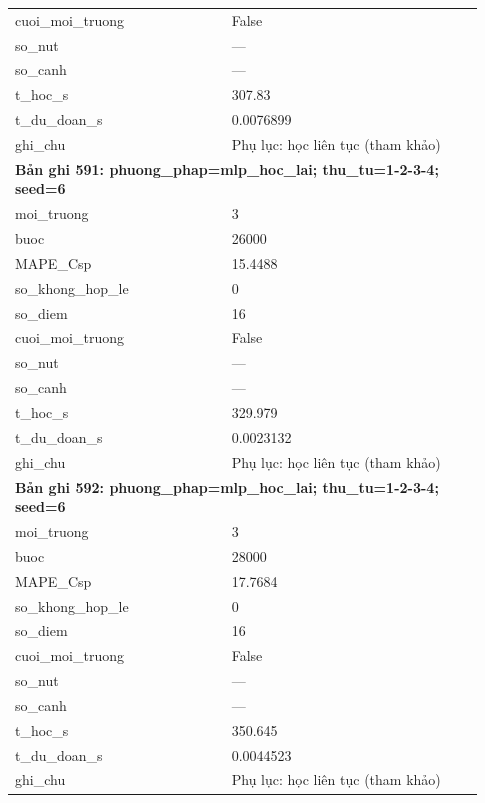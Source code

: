 \begin{longtable}{p{0.43\linewidth}p{0.50\linewidth}}
cuoi\_\allowbreak moi\_\allowbreak truong & False \\
so\_\allowbreak nut & — \\
so\_\allowbreak canh & — \\
t\_\allowbreak hoc\_\allowbreak s & 307.83 \\
t\_\allowbreak du\_\allowbreak doan\_\allowbreak s & 0.0076899 \\
ghi\_\allowbreak chu & Phụ lục: học liên tục (tham khảo) \\
\midrule
\multicolumn{2}{p{0.95\linewidth}}{\textbf{Bản ghi 591: phuong\_phap=mlp\_hoc\_lai; thu\_tu=1-2-3-4; seed=6}} \\
moi\_\allowbreak truong & 3 \\
buoc & 26000 \\
MAPE\_\allowbreak Csp & 15.4488 \\
so\_\allowbreak khong\_\allowbreak hop\_\allowbreak le & 0 \\
so\_\allowbreak diem & 16 \\
cuoi\_\allowbreak moi\_\allowbreak truong & False \\
so\_\allowbreak nut & — \\
so\_\allowbreak canh & — \\
t\_\allowbreak hoc\_\allowbreak s & 329.979 \\
t\_\allowbreak du\_\allowbreak doan\_\allowbreak s & 0.0023132 \\
ghi\_\allowbreak chu & Phụ lục: học liên tục (tham khảo) \\
\midrule
\multicolumn{2}{p{0.95\linewidth}}{\textbf{Bản ghi 592: phuong\_phap=mlp\_hoc\_lai; thu\_tu=1-2-3-4; seed=6}} \\
moi\_\allowbreak truong & 3 \\
buoc & 28000 \\
MAPE\_\allowbreak Csp & 17.7684 \\
so\_\allowbreak khong\_\allowbreak hop\_\allowbreak le & 0 \\
so\_\allowbreak diem & 16 \\
cuoi\_\allowbreak moi\_\allowbreak truong & False \\
so\_\allowbreak nut & — \\
so\_\allowbreak canh & — \\
t\_\allowbreak hoc\_\allowbreak s & 350.645 \\
t\_\allowbreak du\_\allowbreak doan\_\allowbreak s & 0.0044523 \\
ghi\_\allowbreak chu & Phụ lục: học liên tục (tham khảo) \\

\end{longtable}
